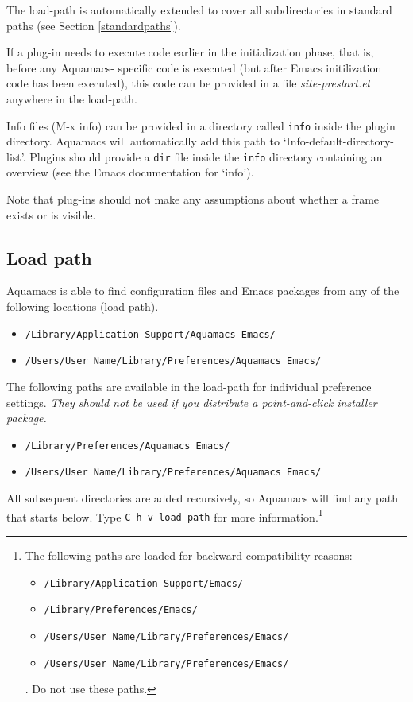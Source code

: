 \documentclass[11pt,letterpaper]{article}
\newcommand{\ttfile}{\tt}
\begin{document}
 The load-path is automatically extended to cover all subdirectories in standard paths (see Section \ref {standardpaths}).

If a plug-in needs to execute code earlier in the initialization phase, that is, before any Aquamacs- specific code is executed (but after Emacs initilization code has been executed), this code can be provided in a file \emph{site-prestart.el} anywhere in the load-path.

Info files (M-x info) can be provided in a directory called {\ttfile info} inside the plugin directory. Aquamacs will automatically add this path to `Info-default-directory-list'. Plugins should provide a {\ttfile dir} file inside the {\ttfile info} directory containing an overview (see the Emacs documentation for `info').

Note that plug-ins should not make any assumptions about whether a frame exists or is visible.


\subsection{Load path}

Aquamacs is able to find configuration files and Emacs packages
from any of the following locations (load-path). 
\label{standardpaths}

\begin{itemize}  
  \item  {\ttfile /Library/Application Support/Aquamacs Emacs/}
  \item  {\ttfile /Users/User Name/Library/Preferences/Aquamacs Emacs/ }
\end{itemize}
The following paths are available in the load-path for individual preference settings. \emph{They should 
not be used if you distribute a point-and-click installer package.}
\begin{itemize}  
  \item  {\ttfile /Library/Preferences/Aquamacs Emacs/ }
  \item  {\ttfile /Users/User Name/Library/Preferences/Aquamacs Emacs/ }
\end{itemize}


All subsequent directories are added recursively, so Aquamacs will
find any path that starts below. Type {\tt C-h v load-path} for more
information.\footnote{The following paths are loaded for backward
  compatibility reasons:
    \begin{itemize}
\item  {\ttfile /Library/Application Support/Emacs/}
\item  {\ttfile /Library/Preferences/Emacs/ }
\item {\ttfile /Users/User Name/Library/Preferences/Emacs/ }
\item {\ttfile /Users/User Name/Library/Preferences/Emacs/ }
    \end{itemize}
. Do not use these paths.}\\
\end{document}
